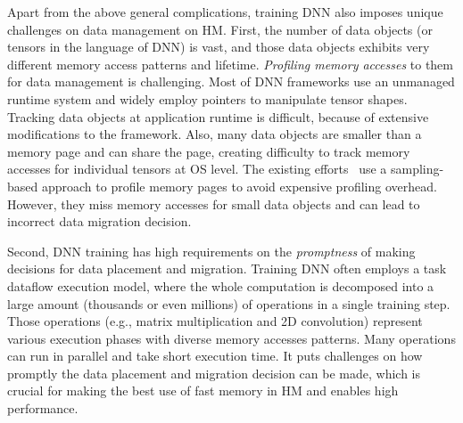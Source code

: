 \textcolor{dong2}{Apart from the above general complications, training DNN also imposes unique challenges on data management on HM. }
\textcolor{dong2}{First, the number of data objects (or tensors in the language of DNN) is vast, and those data objects exhibits very different memory access patterns and lifetime. } \textit{Profiling memory accesses} to them for data management is challenging. Most of DNN frameworks use an unmanaged runtime system and widely employ pointers to manipulate tensor shapes. Tracking data objects at application runtime is difficult, because of extensive modifications to the framework. Also, many data objects are smaller than a memory page and can share the page, creating difficulty to track memory accesses for individual tensors at OS level. \textcolor{dong}{The existing efforts~\cite{Thermostat:asplos17,RAMinate:socc16,heteros:isca17,sc18:wu,unimem:sc17} use a sampling-based approach to profile memory pages to avoid expensive profiling overhead. However, they miss memory accesses for small data objects and can lead to incorrect data migration decision.}

\textcolor{dong2}{Second, DNN training has high requirements on the \emph{promptness} of making decisions for data placement and migration. } Training DNN often employs a task dataflow execution model, where the whole computation is decomposed into a large amount (thousands or even millions) of operations in a single training step. Those operations (e.g., matrix multiplication and 2D convolution) represent various execution phases with diverse memory accesses patterns. Many  operations can run in parallel and take short execution time. 
\textcolor{dong2}{It puts challenges on how promptly the data placement and migration decision can be made, which is crucial for making the best use of fast memory in HM and enables high performance. }

